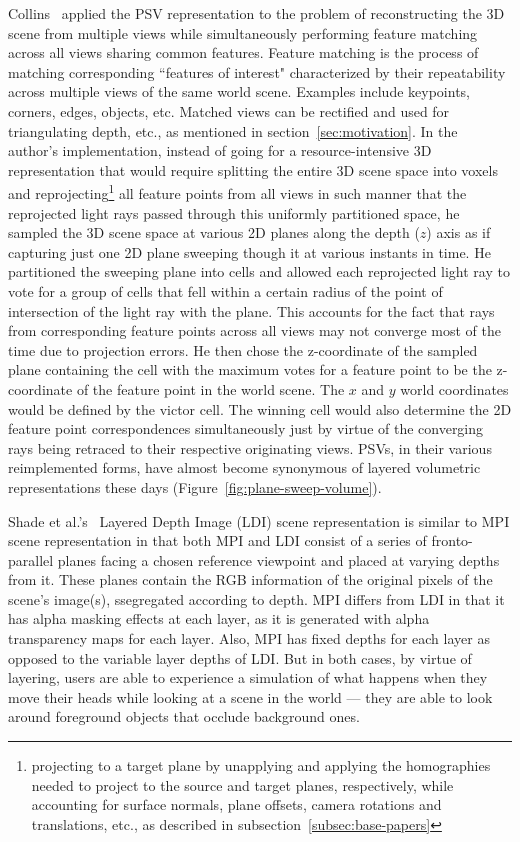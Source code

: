 Collins~\cite{collins_space-sweep_1996} applied the PSV representation to the problem of reconstructing the 3D scene from multiple views while simultaneously performing feature matching across all views sharing common features. Feature matching is the process of matching corresponding ``features of interest" characterized by their repeatability across multiple views of the same world scene. Examples include keypoints, corners, edges, objects, etc. Matched views can be rectified and used for triangulating depth, etc., as mentioned in section~\ref{sec:motivation}. In the author's implementation, instead of going for a resource-intensive 3D representation that would require splitting the entire 3D scene space into voxels and reprojecting\footnote{projecting to a target plane by unapplying and applying the homographies needed to project to the source and target planes, respectively, while accounting for surface normals, plane offsets, camera rotations and translations, etc., as described in subsection~\ref{subsec:base-papers}} all feature points from all views in such manner that the reprojected light rays passed through this uniformly partitioned space, he sampled the 3D scene space at various 2D planes along the depth ($z$) axis as if capturing just one 2D plane sweeping though it at various instants in time. He partitioned the sweeping plane into cells and allowed each reprojected light ray to vote for a group of cells that fell within a certain radius of the point of intersection of the light ray with the plane. This accounts for the fact that rays from corresponding feature points across all views may not converge most of the time due to projection errors. He then chose the z-coordinate of the sampled plane containing the cell with the maximum votes for a feature point to be the z-coordinate of the feature point in the world scene. The $x$ and $y$ world coordinates would be defined by the victor cell. The winning cell would also determine the 2D feature point correspondences simultaneously just by virtue of the converging rays being retraced to their respective originating views. PSVs, in their various reimplemented forms, have almost become synonymous of layered volumetric representations these days (Figure~\ref{fig:plane-sweep-volume}).

Shade et al.'s~\cite{shade_layered_1998} Layered Depth Image (LDI) scene representation is similar to MPI scene representation in that both MPI and LDI consist of a series of fronto-parallel planes facing a chosen reference viewpoint and placed at varying depths from it. These planes contain the RGB information of the original pixels of the scene's image(s), ssegregated according to depth. MPI differs from LDI in that it has alpha masking effects at each layer, as it is generated with alpha transparency maps for each layer. Also, MPI has fixed depths for each layer as opposed to the variable layer depths of LDI. But in both cases, by virtue of layering, users are able to experience a simulation of what happens when they move their heads while looking at a scene in the world --- they are able to look around foreground objects that occlude background ones. 

